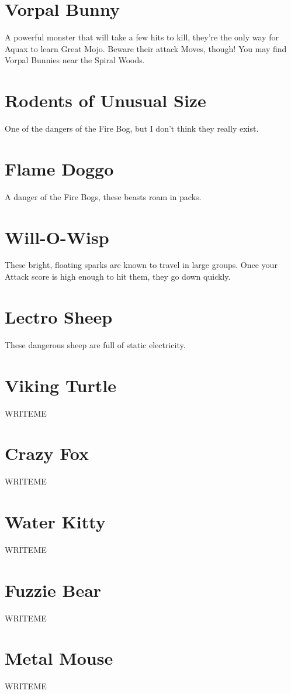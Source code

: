 \documentclass[10pt,twocolumn,openany,article]{memoir}
\begin{document}
\begin{description}
\section*{Vorpal Bunny}
A powerful monster that  will take a few hits to  kill, they're the only
way for  Aquax to learn Great  Mojo. Beware their attack  Moves, though!
You may find Vorpal Bunnies near the Spiral Woods.

\section*{Rodents of Unusual Size}
One of the dangers of the Fire Bog, but I don't think they really exist.

\section*{Flame Doggo}
A danger of the Fire Bogs, these beasts roam in packs.

\section*{Will-O-Wisp}
These  bright, floating  sparks are  known  to travel  in large  groups.
Once your Attack score is high enough to hit them, they go down quickly.

\section*{Lectro Sheep}
These dangerous sheep are full of static electricity.

\section*{Viking Turtle}
WRITEME

\section*{Crazy Fox}
WRITEME

\section*{Water Kitty}
WRITEME

\section*{Fuzzie Bear}
WRITEME

\section*{Metal Mouse}
WRITEME


\end{description}
\end{document}
